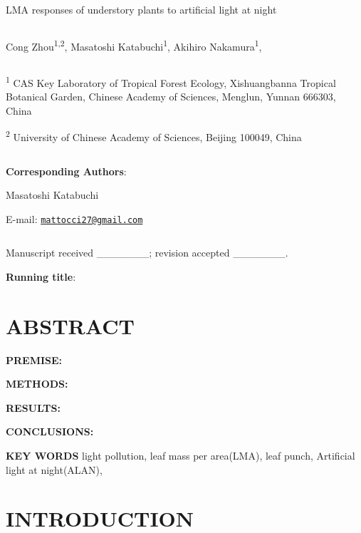 \documentclass[
]{article}
\author{}
\date{\vspace{-2.5em}}
\begin{document}
{
\setcounter{tocdepth}{2}
\tableofcontents
}
\newpage

LMA responses of understory plants to artificial light at night

\[ \]

Cong Zhou\textsuperscript{1,2}, Masatoshi Katabuchi\textsuperscript{1},
Akihiro Nakamura\textsuperscript{1},

\[ \]

\textsuperscript{1} CAS Key Laboratory of Tropical Forest Ecology,
Xishuangbanna Tropical Botanical Garden, Chinese Academy of Sciences,
Menglun, Yunnan 666303, China

\textsuperscript{2} University of Chinese Academy of Sciences, Beijing
100049, China

\[ \]

\textbf{Corresponding Authors}:

Masatoshi Katabuchi

E-mail:
\href{mailto:mattocci27@gmail.com}{\nolinkurl{mattocci27@gmail.com}}

\[ \]

Manuscript received \_\_\_\_\_\_\_; revision accepted \_\_\_\_\_\_\_.

\textbf{Running title}:

\newpage

\hypertarget{abstract}{%
\section{ABSTRACT}\label{abstract}}

\textbf{PREMISE:}

\textbf{METHODS:}

\textbf{RESULTS:}

\textbf{CONCLUSIONS:}

\textbf{KEY WORDS} light pollution, leaf mass per area(LMA), leaf punch,
Artificial light at night(ALAN),

\hypertarget{introduction}{%
\section{INTRODUCTION}\label{introduction}}
\end{document}
